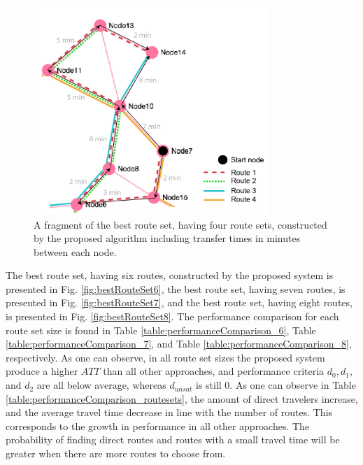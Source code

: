 \begin{figure}[H]
    \begin{center}
    \includegraphics[width=3.5in]{assets/mandl_withTT_utsnitt.png}
    \end{center}
    \caption{A fragment of the best route set, having four route sets, constructed by the proposed algorithm including transfer times in minutes between each node.}
    \label{fig:mandlWithTT} 
\end{figure}

The best route set, having six routes, constructed by the proposed system is presented in Fig. \vref{fig:bestRouteSet6}, the best route set, having seven routes, is presented in Fig. \vref{fig:bestRouteSet7}, and the best route set, having eight routes, is presented in Fig. \vref{fig:bestRouteSet8}. The performance comparison for each route set size is found in Table \vref{table:performanceComparison_6}, Table \vref{table:performanceComparison_7}, and Table \vref{table:performanceComparison_8}, respectively. As one can observe, in all route set sizes the proposed system produce a higher $ATT$ than all other approaches, and performance criteria $d_0, d_1,$ and $d_{2}$ are all below average, whereas $d_{unsat}$ is still 0. %
As one can observe in Table \vref{table:performanceComparison_routesets}, the amount of direct travelers increase, and the average travel time decrease in line with the number of routes. This corresponds to the growth in performance in all other approaches. The probability of finding direct routes and routes with a small travel time will be greater when there are more routes to choose from. 

